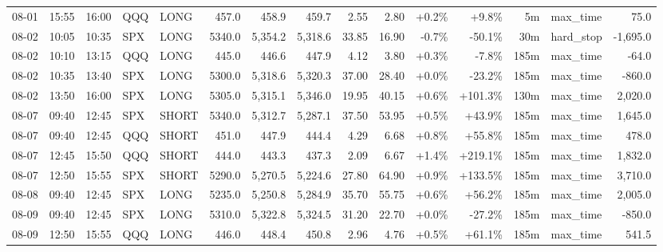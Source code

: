 \documentclass[11pt,a4paper,twoside]{article}
\begin{document}
\begin{landscape}
\begin{center}
\begin{longtable}{>{\color{txtmain}}l l l l l r r r r r r r r >{\color{txtmain}}l r}
08-01 & 15:55 & 16:00 & QQQ & LONG & 457.0 & 458.9 & 459.7 & 2.55 & 2.80 & \textcolor{wingreen}{+0.2\%} & \textcolor{wingreen}{+9.8\%} & 5m & max\_time & \textcolor{wingreen}{75.0} \\
08-02 & 10:05 & 10:35 & SPX & LONG & 5340.0 & 5,354.2 & 5,318.6 & 33.85 & 16.90 & \textcolor{lossred}{-0.7\%} & \textcolor{lossred}{-50.1\%} & 30m & hard\_stop & \textcolor{lossred}{-1,695.0} \\
08-02 & 10:10 & 13:15 & QQQ & LONG & 445.0 & 446.6 & 447.9 & 4.12 & 3.80 & \textcolor{wingreen}{+0.3\%} & \textcolor{lossred}{-7.8\%} & 185m & max\_time & \textcolor{lossred}{-64.0} \\
08-02 & 10:35 & 13:40 & SPX & LONG & 5300.0 & 5,318.6 & 5,320.3 & 37.00 & 28.40 & \textcolor{wingreen}{+0.0\%} & \textcolor{lossred}{-23.2\%} & 185m & max\_time & \textcolor{lossred}{-860.0} \\
08-02 & 13:50 & 16:00 & SPX & LONG & 5305.0 & 5,315.1 & 5,346.0 & 19.95 & 40.15 & \textcolor{wingreen}{+0.6\%} & \textcolor{wingreen}{+101.3\%} & 130m & max\_time & \textcolor{wingreen}{2,020.0} \\
08-07 & 09:40 & 12:45 & SPX & SHORT & 5340.0 & 5,312.7 & 5,287.1 & 37.50 & 53.95 & \textcolor{wingreen}{+0.5\%} & \textcolor{wingreen}{+43.9\%} & 185m & max\_time & \textcolor{wingreen}{1,645.0} \\
08-07 & 09:40 & 12:45 & QQQ & SHORT & 451.0 & 447.9 & 444.4 & 4.29 & 6.68 & \textcolor{wingreen}{+0.8\%} & \textcolor{wingreen}{+55.8\%} & 185m & max\_time & \textcolor{wingreen}{478.0} \\
08-07 & 12:45 & 15:50 & QQQ & SHORT & 444.0 & 443.3 & 437.3 & 2.09 & 6.67 & \textcolor{wingreen}{+1.4\%} & \textcolor{wingreen}{+219.1\%} & 185m & max\_time & \textcolor{wingreen}{1,832.0} \\
08-07 & 12:50 & 15:55 & SPX & SHORT & 5290.0 & 5,270.5 & 5,224.6 & 27.80 & 64.90 & \textcolor{wingreen}{+0.9\%} & \textcolor{wingreen}{+133.5\%} & 185m & max\_time & \textcolor{wingreen}{3,710.0} \\
08-08 & 09:40 & 12:45 & SPX & LONG & 5235.0 & 5,250.8 & 5,284.9 & 35.70 & 55.75 & \textcolor{wingreen}{+0.6\%} & \textcolor{wingreen}{+56.2\%} & 185m & max\_time & \textcolor{wingreen}{2,005.0} \\
08-09 & 09:40 & 12:45 & SPX & LONG & 5310.0 & 5,322.8 & 5,324.5 & 31.20 & 22.70 & \textcolor{wingreen}{+0.0\%} & \textcolor{lossred}{-27.2\%} & 185m & max\_time & \textcolor{lossred}{-850.0} \\
08-09 & 12:50 & 15:55 & QQQ & LONG & 446.0 & 448.4 & 450.8 & 2.96 & 4.76 & \textcolor{wingreen}{+0.5\%} & \textcolor{wingreen}{+61.1\%} & 185m & max\_time & \textcolor{wingreen}{541.5} \\

\end{longtable}
\end{center}
\end{landscape}
\end{document}
